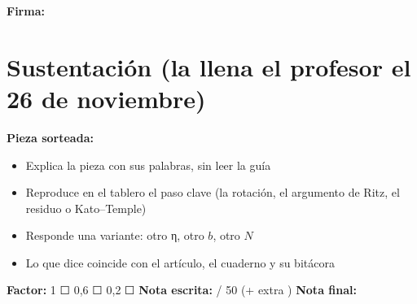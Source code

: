 \textbf{Firma:} 

\section{Sustentación (la llena el profesor el 26 de noviembre)}

\textbf{Pieza sorteada:} 

\begin{itemize}
\item[$\square$] Explica la pieza con sus palabras, sin leer la guía
\item[$\square$] Reproduce en el tablero el paso clave (la rotación, el argumento de Ritz, el residuo o Kato--Temple)
\item[$\square$] Responde una variante: otro η, otro $b$, otro $N$
\item[$\square$] Lo que dice coincide con el artículo, el cuaderno y su bitácora
\end{itemize}

\textbf{Factor:} 1 ☐ 0,6 ☐ 0,2 ☐ \textbf{Nota escrita:}  / 50 (+ extra ) \textbf{Nota final:} 


